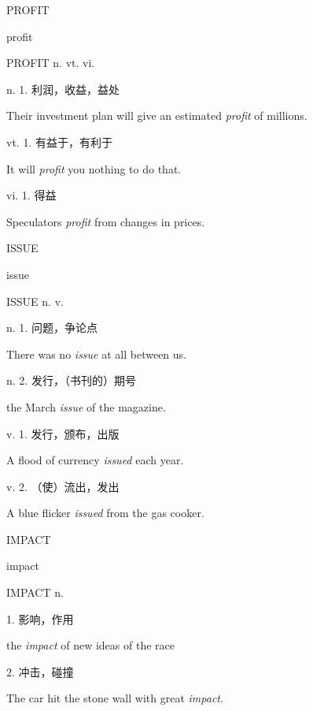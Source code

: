 \begin{flashcard}{
PROFIT

profit
}
\begin{center}
PROFIT n. vt. vi. 
\end{center}
n. 1. 利润，收益，益处

Their investment plan will give an estimated \textit{profit} of  millions.

vt. 1. 有益于，有利于

It will \textit{profit} you nothing to do that.

vi. 1. 得益

Speculators \textit{profit} from changes in prices.

\end{flashcard}
\begin{flashcard}{
ISSUE

issue
}
\begin{center}
ISSUE n. v. 
\end{center}
n. 1. 问题，争论点

There was no \textit{issue} at all between us.

n. 2. 发行，（书刊的）期号

the March \textit{issue} of the magazine.

v. 1. 发行，颁布，出版

A flood of currency \textit{issued} each year.

v. 2. （使）流出，发出

A blue flicker \textit{issued} from the gas cooker.

\end{flashcard}
\begin{flashcard}{
IMPACT

impact
}
\begin{center}
IMPACT n. 
\end{center}
1. 影响，作用

the \textit{impact} of new ideas of the race

2. 冲击，碰撞

The car hit the stone wall with great \textit{impact}.

\end{flashcard}
